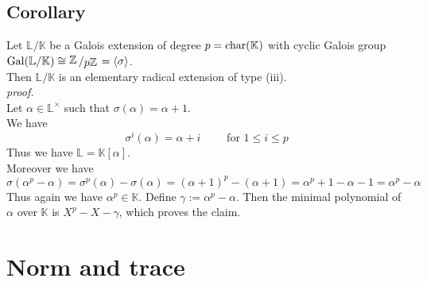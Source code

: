 \documentclass[12pt]{book}
\newcommand{\slant}[2]{{\raisebox{.1em}{$#1$}\left/\raisebox{-.1em}{$#2$}\right.}}
\begin{document}
\begin{spacing}{1.3}
\subsection{Corollary} %
Let $\mathbb{L}/\mathbb{K}$ be a Galois extension of degree $p=\rm{char}(\mathbb{K})$ with cyclic Galois group $\rm{Gal}(\mathbb{L}/\mathbb{K}) \cong \slant{\mathbb{Z}}{p \mathbb{Z}}=\langle \sigma \rangle$.\\ Then $\mathbb{L}/\mathbb{K}$ is an elementary radical extension of type (iii).\\
\textit{proof.}\\
Let $\alpha \in \mathbb{L}^{\times}$ such that $\sigma(\alpha)=\alpha+1$.\\
We have $$\sigma^{i}(\alpha)=\alpha+i \qquad \textrm{ for }1 \leqslant i \leqslant p$$ Thus we have $\mathbb{L}=\mathbb{K}[\alpha]$.\\
Moreover we have
$$\sigma(\alpha^p-\alpha)=\sigma^p(\alpha)-\sigma(\alpha)=\left(\alpha+1\right)^p-(\alpha+1)=\alpha^p+1-\alpha-1=\alpha^p-\alpha$$
Thus again we have $\alpha^p \in \mathbb{K}$. Define $\gamma:= \alpha^p-\alpha$. Then the minimal polynomial of $\alpha$ over $\mathbb{K}$ is $X^p-X-\gamma$, which proves the claim.


\renewcommand*\thesection{\S\ \arabic{section}\quad}
\section{Norm and trace}
\renewcommand*\thesection{\arabic{section}}


\end{spacing}
\end{document}

